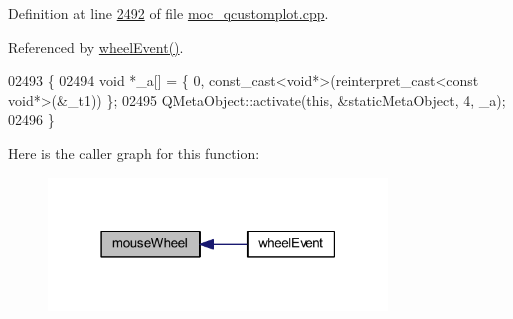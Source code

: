 Definition at line \hyperlink{a00067_source_l02492}{2492} of file \hyperlink{a00067_source}{moc\+\_\+qcustomplot.\+cpp}.



Referenced by \hyperlink{a00115_source_l07811}{wheel\+Event()}.


\begin{DoxyCode}
02493 \{
02494     \textcolor{keywordtype}{void} *\_a[] = \{ 0, \textcolor{keyword}{const\_cast<}\textcolor{keywordtype}{void}*\textcolor{keyword}{>}(\textcolor{keyword}{reinterpret\_cast<}\textcolor{keyword}{const }\textcolor{keywordtype}{void}*\textcolor{keyword}{>}(&\_t1)) \};
02495     QMetaObject::activate(\textcolor{keyword}{this}, &staticMetaObject, 4, \_a);
02496 \}
\end{DoxyCode}


Here is the caller graph for this function\+:
\nopagebreak
\begin{figure}[H]
\begin{center}
\leavevmode
\includegraphics[width=255pt]{d4/d3e/a00116_ac80a14206f99304a91d2aa55775ec3ff_icgraph}
\end{center}
\end{figure}



